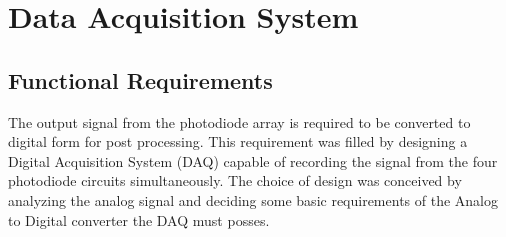 \section{Data Acquisition System}





\subsection{Functional Requirements}
The output signal from the photodiode array is required to be converted to digital form for post processing. This requirement was filled by designing a Digital Acquisition System (DAQ) capable of recording the signal from the four photodiode circuits simultaneously.
The choice of design was conceived by analyzing the analog signal and deciding some basic requirements of the Analog to Digital converter the DAQ must posses. 
